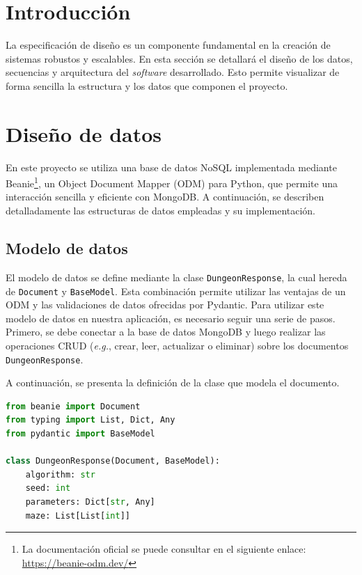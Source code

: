 
\section{Introducción}

La especificación de diseño es un componente fundamental en la creación de sistemas robustos y escalables. En esta sección se detallará el diseño de los datos, secuencias y arquitectura del \textit{software} desarrollado. Esto permite visualizar de forma sencilla la estructura y los datos que componen el proyecto.

\section{Diseño de datos}

En este proyecto se utiliza una base de datos NoSQL implementada mediante Beanie\footnote{La documentación oficial se puede consultar en el siguiente enlace: \url{https://beanie-odm.dev/}}, un Object Document Mapper (ODM) para Python, que permite una interacción sencilla y eficiente con MongoDB. A continuación, se describen detalladamente las estructuras de datos empleadas y su implementación.

\subsection{Modelo de datos}

El modelo de datos se define mediante la clase \texttt{DungeonResponse}, la cual hereda de \texttt{Document} y \texttt{BaseModel}. Esta combinación permite utilizar las ventajas de un ODM y las validaciones de datos ofrecidas por Pydantic. Para utilizar este modelo de datos en nuestra aplicación, es necesario seguir una serie de pasos. Primero, se debe conectar a la base de datos MongoDB y luego realizar las operaciones CRUD (\textit{e.g.}, crear, leer, actualizar o eliminar) sobre los documentos \texttt{DungeonResponse}.

\noindent A continuación, se presenta la definición de la clase que modela el documento.

\vspace{1em} %

\begin{lstlisting}[language=Python]
from beanie import Document
from typing import List, Dict, Any
from pydantic import BaseModel

class DungeonResponse(Document, BaseModel):
    algorithm: str
    seed: int
    parameters: Dict[str, Any]
    maze: List[List[int]]

\end{lstlisting}

